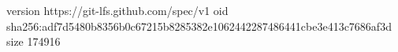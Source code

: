 version https://git-lfs.github.com/spec/v1
oid sha256:adf7d5480b8356b0c67215b8285382e1062442287486441cbe3e413c7686af3d
size 174916
